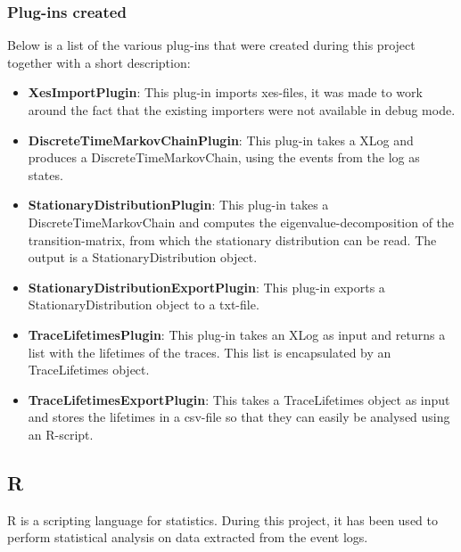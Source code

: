 \subsubsection{Plug-ins created}
Below is a list of the various plug-ins that were created during this project together with a short description:
\begin{itemize}
\item \textbf{XesImportPlugin}: This plug-in imports xes-files, it was made to work around the fact that the existing importers were not available in debug mode.
\item \textbf{DiscreteTimeMarkovChainPlugin}: This plug-in takes a XLog and produces a DiscreteTimeMarkovChain, using the events from the log as states.
\item \textbf{StationaryDistributionPlugin}: This plug-in takes a DiscreteTimeMarkovChain and computes the eigenvalue-decomposition of the transition-matrix, from which the stationary distribution can be read. The output is a StationaryDistribution object.
\item \textbf{StationaryDistributionExportPlugin}: This plug-in exports a StationaryDistribution object to a txt-file.
\item \textbf{TraceLifetimesPlugin}: This plug-in takes an XLog as input and returns a list with the lifetimes of the traces. This list is encapsulated by an TraceLifetimes object.
\item \textbf{TraceLifetimesExportPlugin}: This takes a TraceLifetimes object as input and stores the lifetimes in a csv-file so that they can easily be analysed using an R-script.
\end{itemize}

\subsection{R}
R is a scripting language for statistics. During this project, it has been used to perform statistical analysis on data extracted from the event logs.




